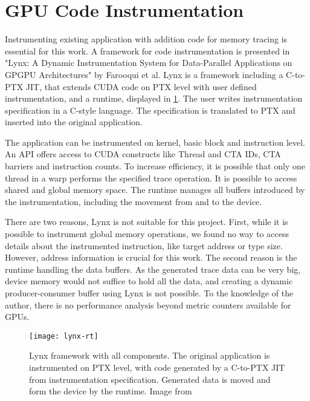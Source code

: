 \section{GPU Code Instrumentation}
Instrumenting existing application with addition code for memory tracing is essential for this work.
A framework for code instrumentation is presented in "Lynx: A Dynamic Instrumentation System for Data-Parallel Applications on GPGPU Architectures" \cite{Farooqui:2012:LDI:2310660.2310989} by Farooqui et al. Lynx is a framework including a C-to-PTX JIT, that extends CUDA code on PTX level with user defined instrumentation, and a runtime, displayed in \ref{lynx-rt}. The user writes instrumentation specification in a C-style language. The specification is translated to PTX and inserted into the original application.

The application can be instrumented on kernel, basic block and instruction level. An API offers access to CUDA constructs like Thread and CTA IDs, CTA barriers and instruction counts. To increase
efficiency, it is possible that only one thread in a warp performs the specified trace operation. It is possible to access shared and global memory space. The runtime manages all buffers introduced by the instrumentation, including the movement from and to the device.

There are two reasons, Lynx is not suitable for this project. First, while it is possible to instrument global memory operations, we found no way to access details about the instrumented instruction, like target address or type size. However, address information is crucial for this work. The second reason
is the runtime handling the data buffers. As the generated trace data can be very big, device memory would not suffice to hold all the data, and creating a dynamic producer-consumer buffer using Lynx is not possible.
To the knowledge of the author, there is no performance analysis beyond metric counters available for GPUs.
\begin{figure}[t]
	\centering
	\texttt{[image: lynx-rt]}
	\caption[Lynx Framework]{Lynx framework with all components. The original application is instrumented on PTX level, with code generated by a C-to-PTX JIT from instrumentation specification. Generated data is moved and form the device by the runtime. Image from \cite{Farooqui:2012:LDI:2310660.2310989}}
	\label{lynx-rt}
\end{figure}
